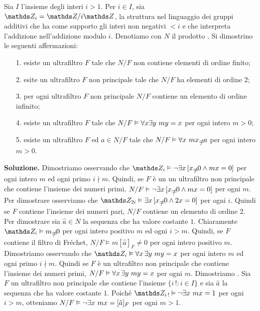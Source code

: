 \begin{exercise}
Sia $I$ l'insieme degli interi $i>1$. Per $i\in I$, sia $\ZZ_i=\ZZ/i\ZZ$, la struttura nel linguaggio dei gruppi additivi che ha come supporto gli interi non negativi $<i$ e che interpreta l'addizione nell'addizione modulo $i$.  Denotiamo con $N$ il prodotto . Si dimostrino le seguenti affermazioni:

\begin{itemize}
\item[1.] esiste un ultrafiltro $F$ tale che $N/F$ non contiene elementi di ordine finito;
\item[2.] esite un ultrafiltro $F$ non principale tale che $N/F$ ha elementi di ordine $2$;
\item[3.] per ogni ultrafiltro $F$ non principale $N/F$ contiene un elemento di ordine infinito;
\item[4.] esiste un ultrafiltro $F$ tale che  $N/F\vDash \forall x\exists y\ my=x$ per ogni intero $m>0$;
\item[5.] esiste un ultrafiltro $F$ ed $a\in N/F$ tale che $N/F\models \A x\ mx\neq a$ per ogni intero $m>0$.
\end{itemize}

\textbf{Soluzione.} Dimostriamo  osservando che $\ZZ_i\models\neg\E x\,[x\neq 0 \wedge mx=0]$  per ogni intero $m$ ed ogni primo $i\nmid m$. Quindi, se $F$ \`e un un ultrafiltro non principale che contiene l'insieme dei numeri primi, $N/F\models\neg\E x\,[x\neq 0 \wedge mx=0]$ per ogni $m$. Per dimostrare  osserviamo che $\ZZ_{2i}\models\E x\,[x\neq 0 \wedge 2x=0]$ per ogni $i$. Quindi se $F$ contiene l'insieme dei numeri pari, $N/F$ contiene un elemento di ordine 2. Per dimostrare  sia $\hat a\in N$ la sequenza che ha valore costante $1$. Chiaramente $\ZZ_i\models m\neq0$ per ogni intero positivo $m$ ed ogni $i>m$. Quindi, se $F$ contiene il filtro di Fr\'echet, $N/F\models m [\hat a]_F\neq 0$ per ogni intero positivo $m$. Dimostriamo  osservando che  $\ZZ_i\models\A x\,\E y\ my=x$ per ogni intero $m$ ed ogni primo $i\nmid m$. Quindi se $F$ \`e un ultrafiltro non principale che contiene l'insieme dei numeri primi,  $N/F\vDash\forall x\,\exists y\ my=x$ per ogni $m$. Dimostriamo . Sia $F$ un ultrafiltro non principale che contiene l'insieme $\{i\,!:i\in I\}$ e sia $\hat a$ la sequenza che ha valore costante $1$. Poich\'e $\ZZ_{i\,!}\models\neg\E x\ mx=1$ per ogni $i>m$, otteniamo $N/F\vDash\neg\exists x\ mx=[\hat a]_F$ per ogni $m>1$.\QED
\end{exercise}

